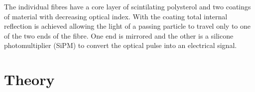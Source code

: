     The individual fibres have a core layer of scintilating polysterol and two coatings of material with decreasing optical index.
    With the coating total internal reflection is achieved allowing the light of a passing particle to travel only to one of the two ends of the fibre.
    One end is mirrored and the other is a silicone photomultiplier (SiPM) to convert the optical pulse into an electrical signal.

\section{Theory}

%
%
  

%
%


\newpage
\printbibliography
